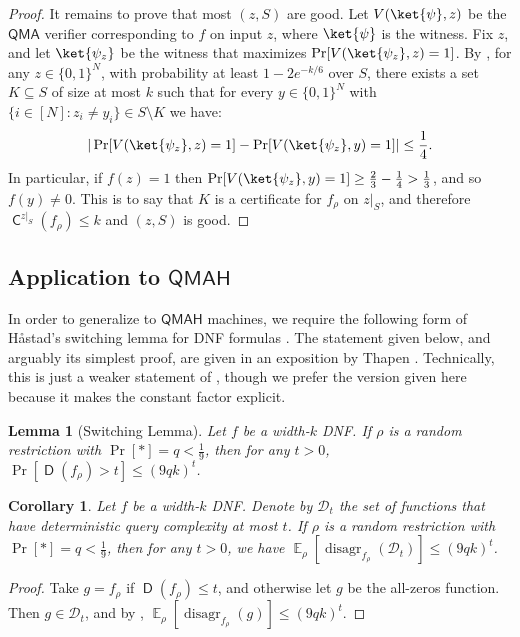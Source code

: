\documentclass[10pt,a4paper]{article}
\newtheorem{corollary}[theorem]{Corollary}
\newtheorem{lemma}[theorem]{Lemma}
\newcommand{\E}{\mathop{\mathbb{E}}}
\DeclareMathOperator{\disagr}{\mathrm{disagr}}
\DeclareMathOperator{\D}{\mathsf{D}}
\DeclareMathOperator{\C}{\mathsf{C}}
\begin{document}
\begin{proof}
It remains to prove that most $(z, S)$ are good. Let $V(\ket{\psi},z)$ be the $\mathsf{QMA}$ verifier corresponding to $f$ on input $z$, where $\ket{\psi}$ is the witness. Fix $z$, and let $\ket{\psi_z}$ be the witness that maximizes $\Pr[V(\ket{\psi_z},z) = 1]$. By , for any $z \in \{0,1\}^N$, with probability at least $1 - 2e^{-k/6}$ over $S$, there exists a set $K \subseteq S$ of size at most $k$ such that for every $y \in \{0,1\}^N$ with $\{i \in [N] : z_i \neq y_i\} \in S \setminus K$ we have:
\[|\Pr[V(\ket{\psi_z},z) = 1] - \Pr[V(\ket{\psi_z},y) = 1]| \le \frac{1}{4}.\]
In particular, if $f(z) = 1$ then $\Pr[V(\ket{\psi_z},y) = 1] \ge \frac{2}{3} - \frac{1}{4} > \frac{1}{3}$, and so $f(y) \neq 0$. This is to say that $K$ is a certificate for $f_\rho$ on $z|_S$, and therefore $\C^{z|_S}(f_\rho) \le k$ and $(z, S)$ is good.
\end{proof}

\subsection{Application to \texorpdfstring{$\mathsf{QMAH}$}{QMAH}}

In order to generalize  to $\mathsf{QMAH}$ machines, we require the following form of H\r{a}stad's switching lemma for DNF formulas \cite{Has87}. The statement given below, and arguably its simplest proof, are given in an exposition by Thapen \cite{Tha09}. Technically, this is just a weaker statement of , though we prefer the version given here because it makes the constant factor explicit.

\begin{lemma}[Switching Lemma]
\label{lem:dnf_random_restriction}
Let $f$ be a width-$k$ DNF. If $\rho$ is a random restriction with $\Pr[*] = q < \frac{1}{9}$, then for any $t > 0$, $\Pr\left[\D(f_\rho) > t \right] \le (9qk)^t$.
\end{lemma}

\begin{corollary}
\label{cor:dnf_random_restriction}
Let $f$ be a width-$k$ DNF. Denote by $\mathcal{D}_t$ the set of functions that have deterministic query complexity at most $t$. If $\rho$ is a random restriction with $\Pr[*] = q < \frac{1}{9}$, then for any $t > 0$, we have $\E_\rho[\disagr_{f_\rho}\left(\mathcal{D}_t\right)] \le (9qk)^t$.
\end{corollary}

\begin{proof}
Take $g = f_\rho$ if $\D(f_\rho) \le t$, and otherwise let $g$ be the all-zeros function. Then $g \in \mathcal{D}_t$, and by , $\E_\rho[\disagr_{f_\rho}\left(g\right)] \le (9qk)^t$.
\end{proof}
\end{document}
